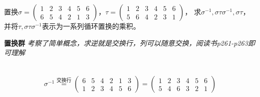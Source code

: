 置换$\sigma=\begin{pmatrix}
    1 & 2 & 3 & 4 & 5 & 6 \\
    6 & 5 & 4 & 2 & 1 & 3
\end{pmatrix}$，$\tau=\begin{pmatrix}
    1 & 2 & 3 & 4 & 5 & 6 \\
    5 & 6 & 4 & 2 & 3 & 1
\end{pmatrix}$，
求$\sigma^{-1}, \sigma\tau\sigma^{-1}, \sigma\tau$，
并将$\tau, \sigma\tau\sigma^{-1}$表示为一系列循环置换的乘积。


\begin{tcolorbox}
    \textbf{置换群} 
    \textit{考察了简单概念，求逆就是交换行，列可以随意交换，阅读书p261-p263即可理解}
\end{tcolorbox}


\begin{solution}\ \\
    \begin{equation*}
        \begin{aligned}
            \sigma^{-1}
            \overset{\text{交换行}}{=}
            \begin{pmatrix}
                6 & 5 & 4 & 2 & 1 & 3 \\
                1 & 2 & 3 & 4 & 5 & 6
            \end{pmatrix}
            =
            \begin{pmatrix}
                1 & 2 & 3 & 4 & 5 & 6 \\
                5 & 4 & 6 & 3 & 2 & 1
            \end{pmatrix}
        \end{aligned}
    \end{equation*}


\end{solution}
